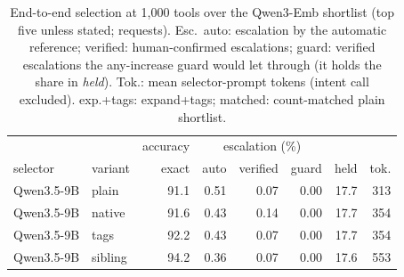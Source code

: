 \begin{table}[t]\centering\caption{End-to-end selection at 1,000 tools over the Qwen3-Emb shortlist (top five unless stated; \NumQueries{} requests). Esc.\ auto: escalation by the automatic reference; verified: human-confirmed escalations; guard: verified escalations the any-increase guard would let through (it holds the share in \emph{held}). Tok.: mean selector-prompt tokens (intent call excluded). exp.+tags: expand+tags; matched: count-matched plain shortlist.}\label{tab:main1k}
\setlength{\tabcolsep}{1.6pt}\footnotesize
\begin{tabular}{llrrrrrr}\toprule
 & & \multicolumn{1}{c}{accuracy} & \multicolumn{3}{c}{escalation (\%)} & & \\
selector & variant & exact & auto & verified & guard & held & tok.\\\midrule
Qwen3.5-9B & plain & 91.1 & 0.51 & 0.07 & 0.00 & 17.7 & 313 \\
Qwen3.5-9B & native & 91.6 & 0.43 & 0.14 & 0.00 & 17.7 & 354 \\
Qwen3.5-9B & tags & 92.2 & 0.43 & 0.07 & 0.00 & 17.7 & 354 \\
Qwen3.5-9B & sibling & 94.2 & 0.36 & 0.07 & 0.00 & 17.6 & 553 \\
\midrule
\midrule
\midrule
\bottomrule\end{tabular}\end{table}

